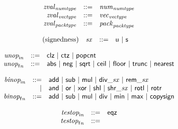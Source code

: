 $$
\begin{array}{@{}lrrl@{}l@{}}
& {{\mathit{zval}}}_{{\mathit{numtype}}} &::=& {{\mathit{num}}}_{{\mathit{numtype}}} \\
& {{\mathit{zval}}}_{{\mathit{vectype}}} &::=& {{\mathit{vec}}}_{{\mathit{vectype}}} \\
& {{\mathit{zval}}}_{{\mathit{packtype}}} &::=& {{\mathit{pack}}}_{{\mathit{packtype}}} \\
\end{array}
$$

\vspace{1ex}

$$
\begin{array}{@{}lrrl@{}l@{}}
\mbox{(signedness)} & {\mathit{sx}} &::=& \mathsf{u} ~|~ \mathsf{s} \\
\end{array}
$$

$$
\begin{array}{@{}lrrl@{}l@{}}
& {{\mathit{unop}}}_{{\mathsf{i}}{{\mathit{n}}}} &::=& \mathsf{clz} ~|~ \mathsf{ctz} ~|~ \mathsf{popcnt} \\
& {{\mathit{unop}}}_{{\mathsf{f}}{{\mathit{n}}}} &::=& \mathsf{abs} ~|~ \mathsf{neg} ~|~ \mathsf{sqrt} ~|~ \mathsf{ceil} ~|~ \mathsf{floor} ~|~ \mathsf{trunc} ~|~ \mathsf{nearest} \\
\end{array}
$$

$$
\begin{array}{@{}lrrl@{}l@{}}
& {{\mathit{binop}}}_{{\mathsf{i}}{{\mathit{n}}}} &::=& \mathsf{add} ~|~ \mathsf{sub} ~|~ \mathsf{mul} ~|~ {\mathsf{div\_}}{{\mathit{sx}}} ~|~ {\mathsf{rem\_}}{{\mathit{sx}}} \\ &&|&
\mathsf{and} ~|~ \mathsf{or} ~|~ \mathsf{xor} ~|~ \mathsf{shl} ~|~ {\mathsf{shr\_}}{{\mathit{sx}}} ~|~ \mathsf{rotl} ~|~ \mathsf{rotr} \\
& {{\mathit{binop}}}_{{\mathsf{f}}{{\mathit{n}}}} &::=& \mathsf{add} ~|~ \mathsf{sub} ~|~ \mathsf{mul} ~|~ \mathsf{div} ~|~ \mathsf{min} ~|~ \mathsf{max} ~|~ \mathsf{copysign} \\
\end{array}
$$

$$
\begin{array}{@{}lrrl@{}l@{}}
& {{\mathit{testop}}}_{{\mathsf{i}}{{\mathit{n}}}} &::=& \mathsf{eqz} \\
& {{\mathit{testop}}}_{{\mathsf{f}}{{\mathit{n}}}} &::=&  \\
\end{array}
$$

